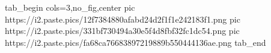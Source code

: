  
 
 
 
 


\ifcmt
  tab_begin cols=3,no_fig,center
     pic https://i2.paste.pics/12f7384880afabd24d2f1f1e242183f1.png
		 pic https://i2.paste.pics/331bf730494a30e5f4d8fbf32fc1dc54.png
		 pic https://i2.paste.pics/fa68ca76683897219889b550444136ae.png
  tab_end
\fi
